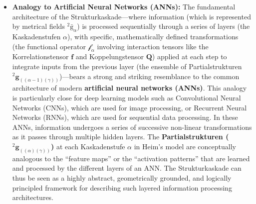 \documentclass[12pt]{article}
\newcommand{\q}[1]{\enquote{#1}}
\newcommand{\kompositionsfeld}{{}^2\bar{\mathrm{g}}}
\newcommand{\partialstruktur}[1]{{}^2\mathbf{g}_{(#1)}}
\newcommand{\korrelationstensor}{\mathbf{f}}
\newcommand{\koppelungstensor}{\mathbf{Q}}
\newcommand{\kaskadenstufe}{\alpha}
\begin{document}
\begin{itemize}
    \item \textbf{Analogy to Artificial Neural Networks (ANNs):}
    The fundamental architecture of the Strukturkaskade—where information (which is represented by metrical fields \( \kompositionsfeld_\alpha \)) is processed sequentially through a series of layers (the Kaskadenstufen \( \kaskadenstufe \)), with specific, mathematically defined transformations (the functional operator \( \mathcal{f}_\alpha \) involving interaction tensors like the Korrelationstensor \( \korrelationstensor \) and Koppelungstensor \( \koppelungstensor \)) applied at each step to integrate inputs from the previous layer (the ensemble of Partialstrukturen \( \partialstruktur{(\alpha-1)(\gamma)} \))—bears a strong and striking resemblance to the common architecture of modern \textbf{artificial neural networks (ANNs)}. This analogy is particularly close for deep learning models such as Convolutional Neural Networks (CNNs), which are used for image processing, or Recurrent Neural Networks (RNNs), which are used for sequential data processing. In these ANNs, information undergoes a series of successive non-linear transformations as it passes through multiple hidden layers. The \textbf{Partialstrukturen (\( \partialstruktur{(\alpha)(\gamma)} \))} at each Kaskadenstufe \( \kaskadenstufe \) in Heim's model are conceptually analogous to the \q{feature maps} or the \q{activation patterns} that are learned and processed by the different layers of an ANN. The Strukturkaskade can thus be seen as a highly abstract, geometrically grounded, and logically principled framework for describing such layered information processing architectures.


\end{itemize}
\end{document}
